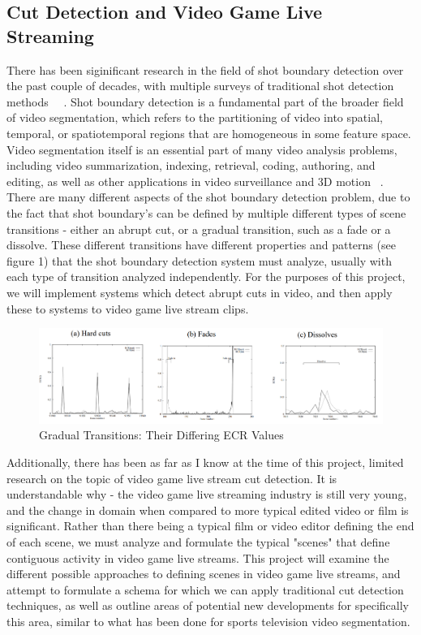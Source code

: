 \documentclass[12pt]{article}
\begin{document}
\subsection{Cut Detection and Video Game Live Streaming}
    There has been siginificant research in the field of shot boundary detection over the past couple of decades, with multiple surveys of traditional shot detection methods
~\cite{lienhart1998comparison}~\cite{survey1}. Shot boundary detection is a fundamental part of the broader field of video segmentation, which refers to the partitioning 
of video into spatial, temporal, or spatiotemporal regions that are homogeneous in some feature space. Video segmentation itself is an essential part of many video analysis problems,
including video summarization, indexing, retrieval, coding, authoring, and editing, as well as other applications in video surveillance and 3D motion ~\cite{bovik2009essential}. There are many different aspects of the shot boundary detection problem, due to the fact that shot boundary's can be defined by multiple 
different types of scene transitions - either an abrupt cut, or a gradual transition, such as a fade or a dissolve. These different transitions have different properties and patterns 
(see figure 1) that the shot boundary detection system must analyze, usually with each type of transition analyzed independently. For the purposes of this project, we will implement
systems which detect abrupt cuts in video, and then apply these to systems to video game live stream clips.
\begin{figure}[ht]
    \centering
    \includegraphics[width=1.0\textwidth]{fig1}
    \caption{Gradual Transitions: Their Differing ECR Values~\cite{lienhart1998comparison}}
    \label{Gradual Transitions}
\end{figure}

    Additionally, there has been as far as I know at the time of this project, limited ~\cite{ringer2018deep} research on the topic of video game live stream cut detection. It is understandable why - the 
video game live streaming industry is still very young, and the change in domain when compared to more typical edited video or film is significant. Rather than there being a typical 
film or video editor defining the end of each scene, we must analyze and formulate the typical "scenes" that define contiguous activity in video game live streams. 
This project will examine the different possible approaches to defining scenes in video game live streams, and attempt to formulate a schema for which we can apply 
traditional cut detection techniques, as well as outline areas of potential new developments for specifically this area, similar to what has been done for sports television
video segmentation.
\clearpage
\end{document}
